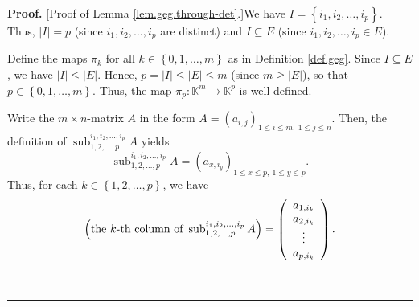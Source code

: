 \documentclass[numbers=enddot,12pt,final,onecolumn,notitlepage]{scrartcl}%
\theoremstyle{definition}
\newenvironment{proof}[1][Proof]{\noindent\textbf{#1.} }{\ \rule{0.5em}{0.5em}}
\renewcommand{\leq}{\leqslant}
\renewcommand{\geq}{\geqslant}
\theoremstyle{plainsl}
\begin{document}
\begin{proof}
[Proof of Lemma \ref{lem.geg.through-det}.]We have $I=\left\{  i_{1}%
,i_{2},\ldots,i_{p}\right\}  $. Thus, $\left\vert I\right\vert =p$ (since
$i_{1},i_{2},\ldots,i_{p}$ are distinct) and $I\subseteq E$ (since
$i_{1},i_{2},\ldots,i_{p}\in E$).

Define the maps $\pi_{k}$ for all $k\in\left\{  0,1,\ldots,m\right\}  $ as in
Definition \ref{def.geg}. Since $I\subseteq E$, we have $\left\vert
I\right\vert \leq\left\vert E\right\vert $. Hence, $p=\left\vert I\right\vert
\leq\left\vert E\right\vert \leq m$ (since $m\geq\left\vert E\right\vert $),
so that $p\in\left\{  0,1,\ldots,m\right\}  $. Thus, the map $\pi
_{p}:\mathbb{K}^{m}\rightarrow\mathbb{K}^{p}$ is well-defined.

Write the $m\times n$-matrix $A$ in the form $A=\left(  a_{i,j}\right)
_{1\leq i\leq m,\ 1\leq j\leq n}$. Then, the definition of
$\operatorname*{sub}\nolimits_{1,2,\ldots,p}^{i_{1},i_{2},\ldots,i_{p}}A$
yields%
\[
\operatorname*{sub}\nolimits_{1,2,\ldots,p}^{i_{1},i_{2},\ldots,i_{p}%
}A=\left(  a_{x,i_{y}}\right)  _{1\leq x\leq p,\ 1\leq y\leq p}.
\]
Thus, for each $k\in\left\{  1,2,\ldots,p\right\}  $, we have%
\begin{equation}
\left(  \text{the }k\text{-th column of }\operatorname*{sub}%
\nolimits_{1,2,\ldots,p}^{i_{1},i_{2},\ldots,i_{p}}A\right)  =\left(
\begin{array}
[c]{c}%
a_{1,i_{k}}\\
a_{2,i_{k}}\\
\vdots\\
a_{p,i_{k}}%
\end{array}
\right)  . \label{pf.lem.geg.through-det.col1}%
\end{equation}



\end{proof}
\end{document}
